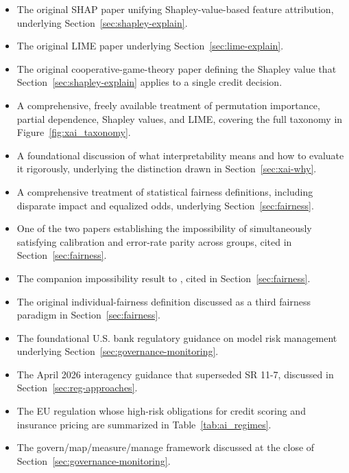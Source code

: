 \documentclass[../ai_in_finance]{subfiles}
\begin{document}
\begin{itemize}
    \item {} The original SHAP paper unifying Shapley-value-based feature attribution, underlying Section~\ref{sec:shapley-explain}.
    \item {} The original LIME paper underlying Section~\ref{sec:lime-explain}.
    \item {} The original cooperative-game-theory paper defining the Shapley value that Section~\ref{sec:shapley-explain} applies to a single credit decision.
    \item {} A comprehensive, freely available treatment of permutation importance, partial dependence, Shapley values, and LIME, covering the full taxonomy in Figure~\ref{fig:xai_taxonomy}.
    \item {} A foundational discussion of what interpretability means and how to evaluate it rigorously, underlying the distinction drawn in Section~\ref{sec:xai-why}.
    \item {} A comprehensive treatment of statistical fairness definitions, including disparate impact and equalized odds, underlying Section~\ref{sec:fairness}.
    \item {} One of the two papers establishing the impossibility of simultaneously satisfying calibration and error-rate parity across groups, cited in Section~\ref{sec:fairness}.
    \item {} The companion impossibility result to \textcite{chouldechova2017fair}, cited in Section~\ref{sec:fairness}.
    \item {} The original individual-fairness definition discussed as a third fairness paradigm in Section~\ref{sec:fairness}.
    \item {} The foundational U.S. bank regulatory guidance on model risk management underlying Section~\ref{sec:governance-monitoring}.
    \item {} The April 2026 interagency guidance that superseded SR 11-7, discussed in Section~\ref{sec:reg-approaches}.
    \item {} The EU regulation whose high-risk obligations for credit scoring and insurance pricing are summarized in Table~\ref{tab:ai_regimes}.
    \item {} The govern/map/measure/manage framework discussed at the close of Section~\ref{sec:governance-monitoring}.

\end{itemize}
\end{document}
